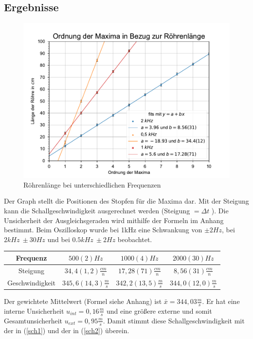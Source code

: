 \documentclass[11pt, a4paper]{article}
\begin{document}
    \subsection{Ergebnisse}
    \begin{figure}[h]
        
        \includegraphics{./Test.pdf}

        \caption{Röhrenlänge bei unterschiedlichen Frequenzen}
        \label{fig:graph3}
    \end{figure}
    Der Graph stellt die Positionen des Stopfen für die Maxima dar. Mit der Steigung kann die Schallgeschwindigkeit
    ausgerechnet werden (Steigung $= \Delta t$ ). Die Unsicherheit der Ausgleichsgeraden wird mithilfe der Formeln im Anhang bestimmt.
    Beim Oszilloskop wurde bei 1kHz eine Schwankung von $\pm 2Hz$, bei $ 2kHz \ \pm 30Hz$ und bei $0.5kHz \ \pm 2Hz $ beobachtet.
  

    \begin{table}
        \centering
        \begin{tabular}[]{c|c|c|c}
            Frequenz & $500(2)Hz$ & $1000(4)Hz$ & $2000(30)Hz$ \\ \hline
            Steigung &  $ 34,4(1,2) \frac{cm}{n}$ & $17,28(71)\frac{cm}{n}$ & $8,56(31)\frac{cm}{n}$ \\ \hline
            Geschwindigkeit & $345,6(14,3) \frac{m}{s}$ & $342,2(13,5) \frac{m}{s}$ & $344,0(12,0)\frac{m}{s}$ 
        \end{tabular}
    \end{table}

    Der gewichtete Mittelwert (Formel siehe Anhang) ist $\bar{x} = 344,03 \frac{m}{s}$. Er hat eine 
    interne Unsicherheit $u_{int} = 0,16\frac{m}{s}$ und eine größere externe und somit Gesamtunsicherheit $u_{ext} = 0,95\frac{m}{s}$.
    Damit stimmt diese Schallgeschwindigkeit mit der in (\ref{sch1}) und der in (\ref{sch2}) überein.
\end{document}
